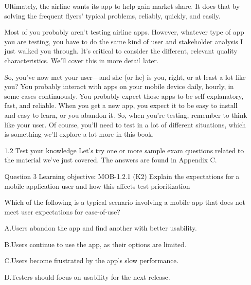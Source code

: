 Ultimately, the airline wants its app to help gain market share. It does that by solving the frequent flyers’ typical problems, reliably, quickly, and easily.

Most of you probably aren’t testing airline apps. However, whatever type of app you are testing, you have to do the same kind of user and stakeholder analysis I just walked you through. It’s critical to consider the different, relevant quality characteristics. We’ll cover this in more detail later.

So, you’ve now met your user—and she (or he) is you, right, or at least a lot like you? You probably interact with apps on your mobile device daily, hourly, in some cases continuously. You probably expect those apps to be self-explanatory, fast, and reliable. When you get a new app, you expect it to be easy to install and easy to learn, or you abandon it. So, when you’re testing, remember to think like your user. Of course, you’ll need to test in a lot of different situations, which is something we’ll explore a lot more in this book.

1.2 Test your knowledge
Let’s try one or more sample exam questions related to the material we’ve just covered. The answers are found in Appendix C.

Question 3 Learning objective: MOB-1.2.1 (K2) Explain the expectations for a mobile application user and how this affects test prioritization

Which of the following is a typical scenario involving a mobile app that does not meet user expectations for ease-of-use?

A.Users abandon the app and find another with better usability.

B.Users continue to use the app, as their options are limited.

C.Users become frustrated by the app’s slow performance.

D.Testers should focus on usability for the next release.